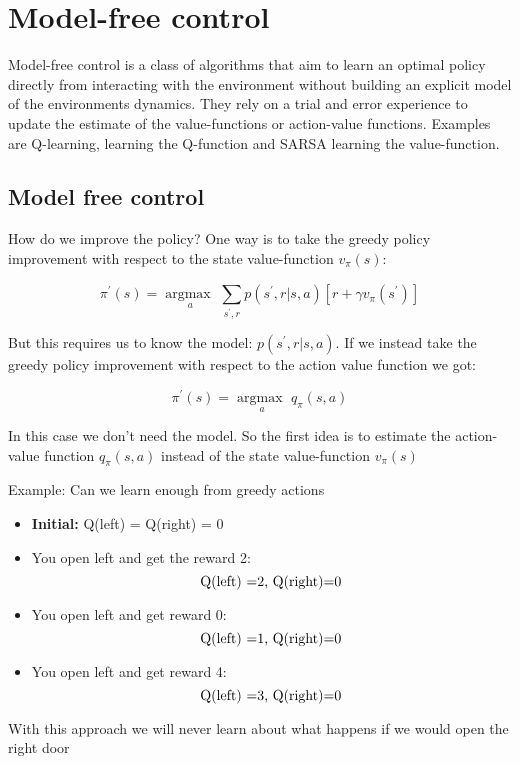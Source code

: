 \section{Model-free control}
Model-free control is a class of algorithms that aim to learn an optimal policy directly from interacting with the environment without building an explicit model of the environments dynamics. They rely on a trial and error experience to update the estimate of the value-functions or action-value functions. Examples are Q-learning, learning the Q-function and SARSA learning the value-function. 

\subsection*{Model free control}
How do we improve the policy? One way is to take the greedy policy improvement with respect to the state value-function $v_\pi(s)$:
	
	\begin{equation}
		\pi^{\prime}(s) = \underset{a}{\arg \text{max }} \sum_{s^{\prime}, r}^{}p(s^{\prime},r |s,a)[r+\gamma v_\pi(s^{\prime})]
	\end{equation}

But this requires us to know the model: $p(s^{\prime},r|s,a)$. If we instead take the greedy policy improvement with respect to the action value function we got:

	\begin{equation}
		\pi^{\prime}(s) = \underset{a}{\arg \text{max }} q_\pi(s,a) 
	\end{equation}

In this case we don't need the model. So the first idea is to estimate the action-value function $q_\pi(s,a)$ instead of the state value-function $v_\pi(s)$

\begin{example}{Example: Can we learn enough from greedy actions}
\begin{itemize}
	\item \textbf{Initial: } Q(left) = Q(right) = 0
	\item You open left and get the reward 2:
		\begin{equation*}
			\text{Q(left) =2, \text{Q(right)=0}}
		\end{equation*}
	\item You open left and get reward 0:
		\begin{equation*}
			\text{Q(left) =1, \text{Q(right)=0}}
		\end{equation*}
	\item You open left and get reward 4:
		\begin{equation*}
			\text{Q(left) =3, \text{Q(right)=0}}
		\end{equation*}
\end{itemize}

With this approach we will never learn about what happens if we would open the right door
\end{example}	

